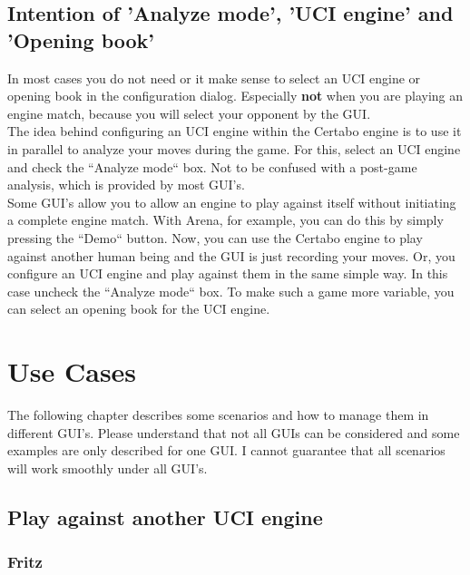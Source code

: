 \documentclass[11pt,a4paper]{article}
\begin{document}
\subsection{Intention of 'Analyze mode', 'UCI engine' and 'Opening book'}
In most cases you do not need or it make sense to select an UCI engine or opening book in the configuration dialog. Especially \textbf{not} when you are playing an engine match, because you will select your opponent by the GUI.\\The idea behind configuring an UCI engine within the Certabo engine is to use it in parallel to analyze your moves during the game. For this, select an UCI engine and check the ``Analyze mode`` box. Not to be confused with a post-game analysis, which is provided by most GUI's.\\
Some GUI's allow you to allow an engine to play against itself without initiating a complete engine match. With Arena, for example, you can do this by simply pressing the ``Demo`` button. Now, you can use the Certabo engine to play against another human being and the GUI is just recording your moves. Or, you configure an UCI engine and play against them in the same simple way. In this case uncheck the ``Analyze mode`` box. To make such a game more variable, you can select an opening book for the UCI engine.\\

\newpage
\section{Use Cases}
The following chapter describes some scenarios and how to manage them in different GUI’s. Please understand that not all GUIs can be considered and some examples are only described for one GUI. I cannot guarantee that all scenarios will work smoothly under all GUI's.
\subsection{Play against another UCI engine}
\subsubsection{Fritz}
\end{document}
